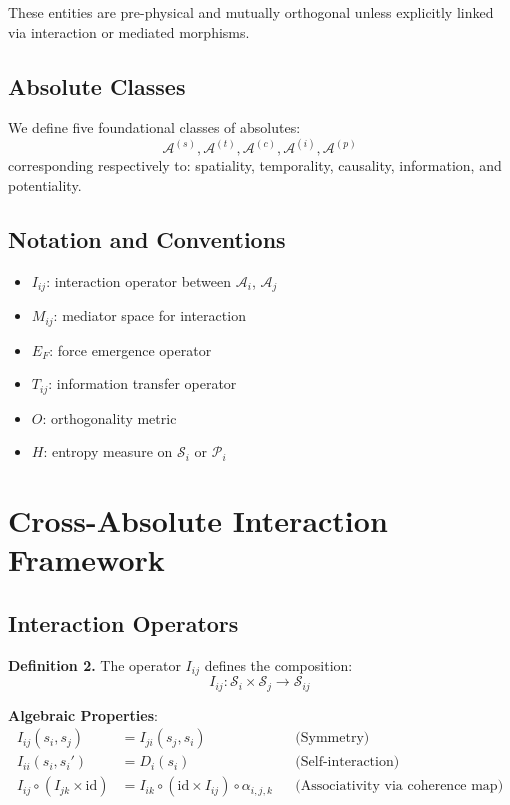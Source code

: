 \documentclass[11pt]{article}
\begin{document}
These entities are pre-physical and mutually orthogonal unless explicitly linked via interaction or mediated morphisms.

\subsection{Absolute Classes}

We define five foundational classes of absolutes:
\[
\mathcal{A}^{(s)}, \mathcal{A}^{(t)}, \mathcal{A}^{(c)}, \mathcal{A}^{(i)}, \mathcal{A}^{(p)}
\]
corresponding respectively to: spatiality, temporality, causality, information, and potentiality.

\subsection{Notation and Conventions}

\begin{itemize}[noitemsep]
    \item $I_{ij}$: interaction operator between $\mathcal{A}_i$, $\mathcal{A}_j$
    \item $M_{ij}$: mediator space for interaction
    \item $E_F$: force emergence operator
    \item $T_{ij}$: information transfer operator
    \item $O$: orthogonality metric
    \item $H$: entropy measure on $\mathcal{S}_i$ or $\mathcal{P}_i$
\end{itemize}

\section{Cross-Absolute Interaction Framework}

\subsection{Interaction Operators}

\textbf{Definition 2.} The operator $I_{ij}$ defines the composition:
\[
I_{ij} : \mathcal{S}_i \times \mathcal{S}_j \rightarrow \mathcal{S}_{ij}
\]

\textbf{Algebraic Properties}:
\begin{align*}
I_{ij}(s_i, s_j) &= I_{ji}(s_j, s_i) && \text{(Symmetry)} \\
I_{ii}(s_i, s_i') &= D_i(s_i) && \text{(Self-interaction)} \\
I_{ij} \circ (I_{jk} \times \mathrm{id}) &= I_{ik} \circ (\mathrm{id} \times I_{ij}) \circ \alpha_{i,j,k} && \text{(Associativity via coherence map)}
\end{align*}
\end{document}
